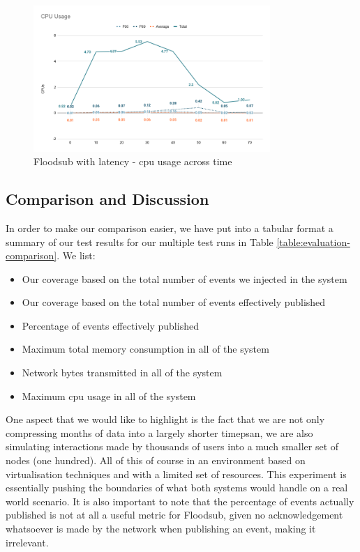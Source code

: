 \begin{figure}[!htb]
  \centering
  \includegraphics[width=0.8\textwidth]{../images/graph-floodsub-cpu.png}
  \caption{Floodsub with latency - \acrshort{cpu} usage across time}
  \label{fig:graph-floodsub-latency-cpu}
\end{figure}

\subsection{Comparison and Discussion}\label{subsec:comparison}

In order to make our comparison easier, we have put into a tabular format a
summary of our test results for our multiple test runs in Table
\ref{table:evaluation-comparison}. We list:

\begin{itemize}
  \item Our coverage based on the total number of events we injected in the
    system
  \item Our coverage based on the total number of events effectively published
  \item Percentage of events effectively published
  \item Maximum total memory consumption in all of the system
  \item Network bytes transmitted in all of the system
  \item Maximum \acrshort{cpu} usage in all of the system
\end{itemize}

One aspect that we would like to highlight is the fact that we are not only
compressing months of data into a largely shorter timepsan, we are also
simulating interactions made by thousands of users into a much smaller set of
nodes (one hundred). All of this of course in an environment based on
virtualisation techniques and with a limited set of resources. This experiment
is essentially pushing the boundaries of what both systems would handle on a
real world scenario. It is also important to note that the percentage of events
actually published is not at all a useful metric for Floodsub, given no
acknowledgement whatsoever is made by the network when publishing an event,
making it irrelevant.

